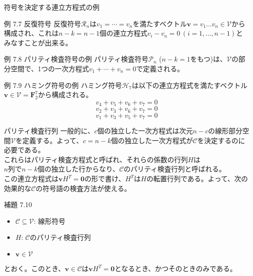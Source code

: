 \documentclass[dvipdfmx,10pt,jsarticle]{beamer}
\begin{document}
  \begin{frame}{符号を決定する連立方程式の例}
    \begin{block}{例 7.7 反復符号}
      反復符号$\mathcal{R}_n$は$v_1 = \cdots = v_n$を満たすベクトル$\mathbf{v} = v_1 \ldots v_n \in \mathcal{V}$から構成され、これは$n-k = n-1$個の連立方程式$v_i - v_n = 0 \ (i = 1,\ldots,n-1)$とみなすことが出来る。
    \end{block}
    \begin{block}{例 7.8 パリティ検査符号の例}
      パリティ検査符号$\mathcal{P}_n$ ($n-k=1$をもつ)は、$\mathcal{V}$の部分空間で、1つの一次方程式$v_1 + \cdots + v_n = 0$で定義される。
    \end{block}
    \begin{block}{例 7.9 ハミング符号の例}
      ハミング符号$\mathcal{H}_7$は以下の連立方程式を満たすベクトル$\mathbf{v} \in \mathcal{V} = \mathbf{F}_2^7$から構成される。
      \[ v_4 + v_5 + v_6 + v_7 = 0 \]
      \[ v_2 + v_3 + v_6 + v_7 = 0 \]
      \[ v_1 + v_3 + v_5 + v_7 = 0 \]
    \end{block}
  \end{frame}
  \begin{frame}{パリティ検査行列}
    一般的に、$c$個の独立した一次方程式は次元$n-c$の線形部分空間$\mathcal{V}$を定義する。よって、$c=n-k$個の独立した一次方程式が$\mathcal{C}$を決定するのに必要である。\\
    これらはパリティ検査方程式と呼ばれ、それらの係数の行列$H$は\\
    $n$列で$n-k$個の独立した行からなり、$\mathcal{C}$のパリティ検査行列と呼ばれる。 \\
    この連立方程式は$\mathbf{v} H^T = \mathbf{0}$の形で書け、$H^T$は$H$の転置行列である。よって、次の効果的な$\mathcal{C}$の符号語の検査方法が使える。

    \begin{block}{補題 7.10}
      \begin{itemize}
        \item $\mathcal{C} \subseteq \mathcal{V}$: 線形符号
        \item $H$: $\mathcal{C}$のパリティ検査行列
        \item $\mathbf{v} \in \mathcal{V}$
      \end{itemize}
      とおく。このとき、$\mathbf{v} \in \mathcal{C}$は$\mathbf{v} H^T = \mathbf{0}$となるとき、かつそのときのみである。
    \end{block}
  \end{frame}
  
\end{document}
